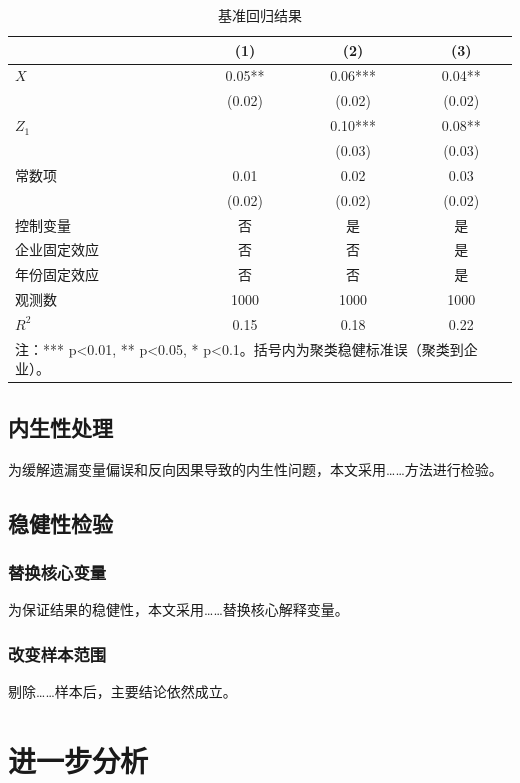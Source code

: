 \documentclass[10.5pt, UTF8, twocolumn, landscape]{ctexart}
\newcommand{\wuhao}{\fontsize{9pt}{13pt}\selectfont}
\begin{document}
\begin{table}[htbp]
\centering
\caption{基准回归结果}
\label{tab:reg}
\wuhao
\begin{tabular}{lccc}
\toprule
 & (1) & (2) & (3) \\
\midrule
$X$ & 0.05** & 0.06*** & 0.04** \\
    & (0.02) & (0.02) & (0.02) \\
$Z_1$ & & 0.10*** & 0.08** \\
      &      & (0.03)  & (0.03) \\
\midrule
常数项 & 0.01 & 0.02 & 0.03 \\
       & (0.02) & (0.02) & (0.02) \\
\midrule
控制变量 & 否 & 是 & 是 \\
企业固定效应 & 否 & 否 & 是 \\
年份固定效应 & 否 & 否 & 是 \\
\midrule
观测数 & 1000 & 1000 & 1000 \\
$R^2$ & 0.15 & 0.18 & 0.22 \\
\bottomrule
\multicolumn{4}{l}{\small 注：*** p<0.01, ** p<0.05, * p<0.1。括号内为聚类稳健标准误（聚类到企业）。}
\end{tabular}
\end{table}

\subsection{内生性处理}
为缓解遗漏变量偏误和反向因果导致的内生性问题，本文采用……方法进行检验。

\subsection{稳健性检验}

\subsubsection{替换核心变量}
为保证结果的稳健性，本文采用……替换核心解释变量。

\subsubsection{改变样本范围}
剔除……样本后，主要结论依然成立。

\section{进一步分析}
\label{sec:进一步}
\end{document}
